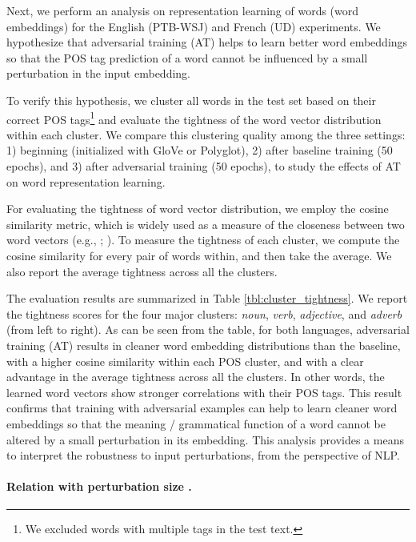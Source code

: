 \documentclass[11pt,a4paper]{article}
\begin{document}
Next, we perform an analysis on representation learning of words (word embeddings) for the English (PTB-WSJ) and French (UD) experiments.
We hypothesize that adversarial training (AT) helps to learn better word embeddings so that the POS tag prediction of a word cannot be influenced by a small perturbation in the input embedding.

To verify this hypothesis, 
we cluster all words in the test set based on their correct POS tags\footnote{We excluded words with multiple tags in the test text.}
and evaluate the tightness of the word vector distribution within each cluster. 
We compare this clustering quality among the three settings: 1) beginning (initialized with GloVe or Polyglot), 2) after baseline training (50 epochs), and 3) after adversarial training (50 epochs), to study the effects of AT on word representation learning.


For evaluating
the tightness of word vector distribution, we employ the
cosine similarity metric, which is widely used as a measure of the closeness between two word vectors
(e.g., ; ).
To measure the tightness of each cluster, we compute the cosine similarity for every pair of words within, and then take the average.
We also report the average tightness across all the clusters.




The evaluation results are summarized in Table \ref{tbl:cluster_tightness}.
We report the tightness scores for the four major clusters: {\it noun}, {\it verb}, {\it adjective}, and {\it adverb} (from left to right).
As can be seen from the table, for both languages, adversarial training (AT) results in cleaner word embedding distributions than the baseline, with a higher cosine similarity within each POS cluster, and with a clear advantage in the average tightness across all the clusters.
In other words, the learned word vectors show stronger correlations with their POS tags.
This result confirms that training with adversarial examples can help to learn cleaner word embeddings so that the meaning \!/\! grammatical function of a word cannot be altered by a small perturbation in its embedding.
This analysis provides a means to
interpret the robustness to input perturbations, from the perspective of NLP.



\paragraph{Relation with perturbation size .
}
\end{document}
